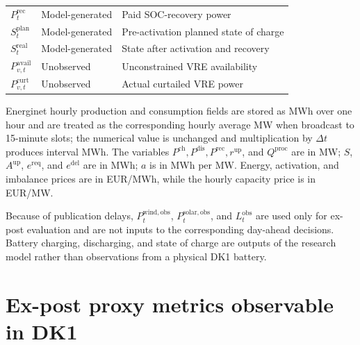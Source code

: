 \documentclass[11pt,a4paper]{article}
\begin{document}
\begin{table}[htbp]
\begin{tabular}{lll}
    $P^{\mathrm{rec}}_t$ & Model-generated & Paid SOC-recovery power \\
    $S^{\mathrm{plan}}_t$ & Model-generated & Pre-activation planned state of charge \\
    $S^{\mathrm{real}}_t$ & Model-generated & State after activation and recovery \\
    $P^{\mathrm{avail}}_{v,t}$ & Unobserved & Unconstrained VRE availability \\
    $P^{\mathrm{curt}}_{v,t}$ & Unobserved & Actual curtailed VRE power \\
    \bottomrule
  \end{tabular}
  \label{tab:variables}
\end{table}

Energinet hourly production and consumption fields are stored as MWh over one
hour and are treated as the corresponding hourly average MW when broadcast to
15-minute slots; the numerical value is unchanged and multiplication by
$\Delta t$ produces interval MWh.  The variables
$P^{\mathrm{ch}},P^{\mathrm{dis}},P^{\mathrm{rec}},r^{\mathrm{up}}$, and
$Q^{\mathrm{proc}}$ are in MW; $S$, $A^{\mathrm{up}}$, $e^{\mathrm{req}}$,
and $e^{\mathrm{del}}$ are in MWh; $a$ is in MWh per MW.  Energy, activation,
and imbalance prices are in EUR/MWh, while the hourly capacity price is in
EUR/MW.

Because of publication delays, $P^{\mathrm{wind,obs}}_t$, $P^{\mathrm{solar,obs}}_t$, and $L^{\mathrm{obs}}_t$ are used only for ex-post evaluation and are not inputs to the corresponding day-ahead decisions. Battery charging, discharging, and state of charge are outputs of the research model rather than observations from a physical DK1 battery.

\section{Ex-post proxy metrics observable in DK1}
\end{document}
